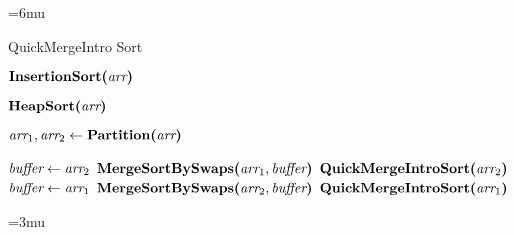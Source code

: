 \begin{algorithm}[H]
	\unboldmath
	\thinmuskip=6mu
	\caption{QuickMergeIntro Sort}
	\begin{algorithmic}[1]
		
		\State
		  \label{line:insertion-sort}
		\State $\textbf{InsertionSort(}\textit{arr}\textbf{)}$
		
		\State
		  \label{line:heap-sort}
		\State $\textbf{HeapSort(}\textit{arr}\textbf{)}$
		
		\State
		\Else \label{line:quick-merge-intro-sort}
		\State $\textit{arr}_1, \textit{arr}_2 \gets \textbf{Partition(}\textit{arr}\textbf{)}$ 
		
		\State
		 
		\State $\textit{buffer} \gets \textit{arr}_2$
		\State $\textbf{MergeSortBySwaps(}\textit{arr}_1, \textit{buffer}\textbf{)}$
		\State $\textbf{QuickMergeIntroSort(}\textit{arr}_2\textbf{)}$
		\Else
		\State $\textit{buffer} \gets \textit{arr}_1$
		\State $\textbf{MergeSortBySwaps(}\textit{arr}_2, \textit{buffer}\textbf{)}$
		\State $\textbf{QuickMergeIntroSort(}\textit{arr}_1\textbf{)}$
		\EndIf
		\EndIf
		
		\State
		\EndProcedure
	\end{algorithmic}
	\boldmath
	\thinmuskip=3mu
	\label{pseudocode:quick-merge-intro-sort}
\end{algorithm}
